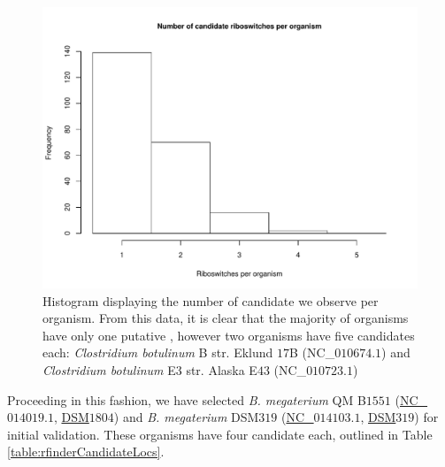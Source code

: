 \begin{figure}[!ht]
\centering
\includegraphics[width=.9\textwidth]{Figures/Ribofinder/candidateHistogramGroupedByAccession.pdf}
\caption[Histogram displaying the number of candidate \rbs we observe
per organism]{Histogram displaying the number of candidate \rbs we observe
per organism. From this data, it is clear that the majority of organisms have
only one putative \rb, however two organisms have five candidates each:
{\em Clostridium botulinum} B str. Eklund $17$B (NC\_$010674.1$) and
{\em Clostridium botulinum} E3 str. Alaska E$43$ (NC\_$010723.1$)}
\label{fig:rfinder:candidateHistogramGroupedByAccession}
\end{figure}

Proceeding in this fashion, we have selected {\em B. megaterium} QM B$1551$
(\href{http://www.ncbi.nlm.nih.gov/nuccore/NC_014019.1}{NC\_$014019.1$},
\href{http://www.dsmz.de/catalogues/details/culture/DSM-1804.html}{DSM$1804$})
and {\em B. megaterium} DSM$319$
(\href{http://www.ncbi.nlm.nih.gov/nuccore/NC_014103.1}{NC\_$014103.1$},
\href{http://www.dsmz.de/catalogues/details/culture/DSM-319.html}{DSM$319$})
for initial validation. These organisms have four
candidate \grbs each, outlined in Table \ref{table:rfinderCandidateLocs}.

